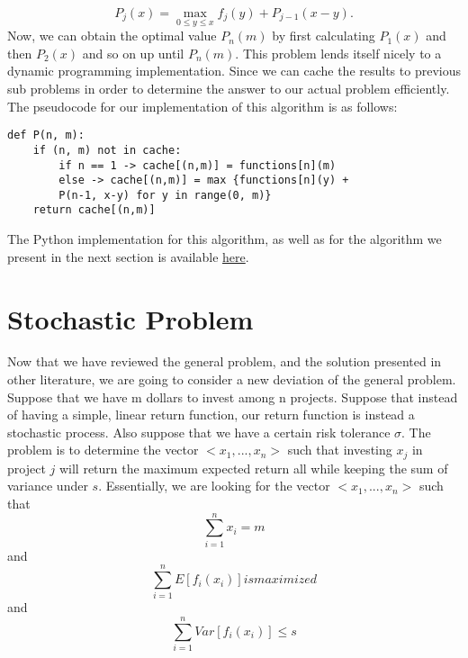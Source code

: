 \documentclass{article}
\begin{document}
\newline
$$P_{j}(x) = \max_{0\leq y\leq x} f_{j}(y) + P_{j-1}(x-y).$$
\newline
Now, we can obtain the optimal value $P_{n}(m)$ by first calculating $P_{1}(x)$ and then $P_{2}(x)$ and so on up until $P_{n}(m).$ 
\newline
This problem lends itself nicely to a dynamic programming implementation. Since we can cache the results to previous sub problems in order to determine the answer to our actual problem efficiently.  The pseudocode for our implementation of this algorithm is as follows:
\newline
\begin{lstlisting}
def P(n, m):
    if (n, m) not in cache:
        if n == 1 -> cache[(n,m)] = functions[n](m)
        else -> cache[(n,m)] = max {functions[n](y) + 
        P(n-1, x-y) for y in range(0, m)}
    return cache[(n,m)]

\end{lstlisting}
\newline
The Python implementation for this algorithm, as well as for the algorithm we present in the next section is available  \href{http://www.github.com/awallish/optimization-models}{here}.

\section{Stochastic Problem}
Now that we have reviewed the general problem, and the solution presented in other literature, we are going to consider a new deviation of the general problem.  
\breakline
Suppose that we have m dollars to invest among n projects. Suppose that instead of having a simple, linear return function, our return function is instead a stochastic process. Also suppose that we have a certain risk tolerance $\sigma$. The problem is to determine the vector $<x_{1},...,x_{n}>$ such that investing $x_{j}$ in project $j$ will return the maximum expected return all while keeping the sum of variance under $s$. Essentially, we are looking for the vector $<x_{1},...,x_{n}>$ such that 
$$\sum_{i=1}^{n}x_{i} = m$$
and
$$\sum_{i=1}^{n} E[f_{i}(x_{i})] is maximized$$
and
$$\sum_{i=1}^{n} Var[f_{i}(x_{i})] \leq s$$
\end{document}
